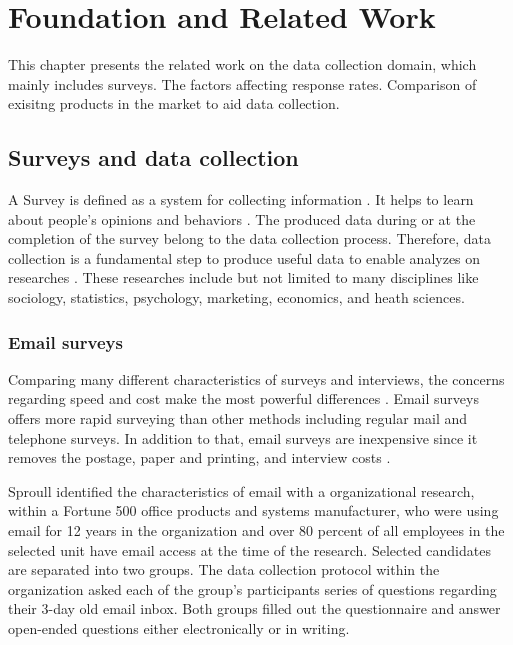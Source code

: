 \chapter{Foundation and Related Work}
\label{chp:FouRelWor}
This chapter presents the related work on the data collection domain, which mainly includes surveys. The factors affecting response rates. Comparison of exisitng products in the market to aid data collection. 

\section{Surveys and data collection}
\label{sec:1:SurDatCol}
A Survey is defined as a system for collecting information \cite[page 3]{Sue2011}. It helps to learn about people's opinions and behaviors \cite{DillmanDonA.SmythJoleneD.Christian2009}.  The produced data during or at the completion of the survey belong to the data collection process. Therefore, data collection is a fundamental step to produce useful data to enable analyzes on researches \cite[page 149]{Groves2009}. These researches include but not limited to many disciplines like sociology, statistics, psychology, marketing, economics, and heath sciences. 

\subsection{Email surveys}
\label{sec:2.1.1:EmaSur}

Comparing many different characteristics of surveys and interviews, the concerns regarding speed and cost make the most powerful differences \cite{Sproull1986, Schaefer1998}. Email surveys offers more rapid surveying than other methods including regular mail and telephone surveys. In addition to that, email surveys are inexpensive since it removes the postage, paper and printing, and interview costs \cite{Schaefer1998}.
\vspace{1cm}

Sproull \cite{Sproull1986} identified the characteristics of email with a organizational research, within a Fortune 500 office products and systems manufacturer, who were using email for 12 years in the organization and over 80 percent of all employees in the selected unit have email access at the time of the research. Selected candidates are separated into two groups. The data collection protocol within the organization asked each of the group's participants series of questions regarding their 3-day old email inbox. Both groups filled out the questionnaire and answer open-ended questions either electronically or in writing.
\vspace{1cm}


